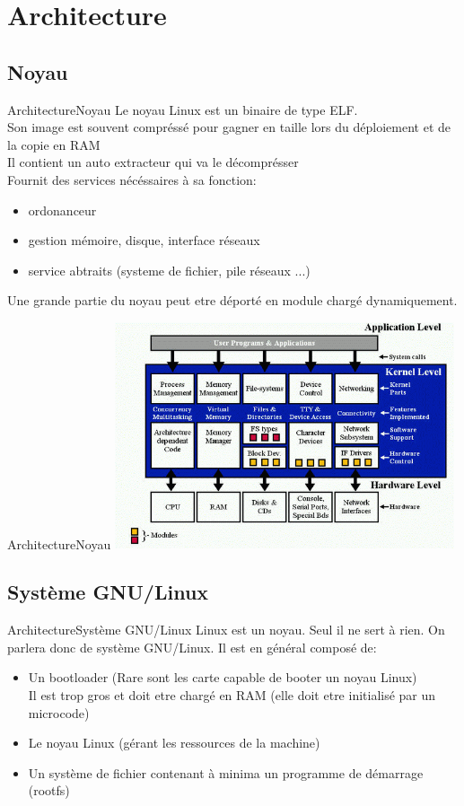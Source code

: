 \section{Architecture}

\subsection{Noyau}
\begin{frame}{Architecture}{Noyau}
	Le noyau Linux est un binaire de type ELF.\\
	Son image est souvent compréssé pour gagner en taille lors du déploiement et de la copie en RAM\\
	Il contient un auto extracteur qui va le décomprésser\\
	Fournit des services nécéssaires à sa fonction:
	\begin{itemize}
		\item
			ordonanceur
		\item
			gestion mémoire, disque, interface réseaux
		\item
			service abtraits (systeme de fichier, pile réseaux ...)
	\end{itemize}
	Une grande partie du noyau peut etre déporté en module chargé dynamiquement.
\end{frame}

\begin{frame}{Architecture}{Noyau}
	\includegraphics[width=10cm]{kernel_arch.png}
\end{frame}

\subsection{Système GNU/Linux}
\begin{frame}{Architecture}{Système GNU/Linux}
	Linux est un noyau. Seul il ne sert à rien. On parlera donc de système GNU/Linux.
	Il est en général composé de:
	\begin{itemize}
		\item
			Un bootloader (Rare sont les carte capable de booter un noyau Linux)\\
			Il est trop gros et doit etre chargé en RAM (elle doit etre initialisé par un microcode)
		\item
			Le noyau Linux (gérant les ressources de la machine)
		\item
			Un système de fichier contenant à minima un programme de démarrage (rootfs)
	\end{itemize}
\end{frame}

